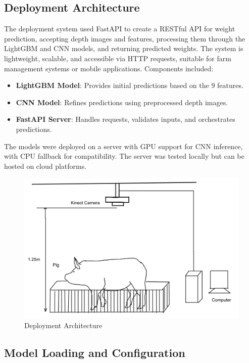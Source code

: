 {\subsection{Deployment Architecture}

The deployment system used FastAPI to create a RESTful API for weight prediction, accepting depth images and features, processing them through the LightGBM and CNN models, and returning predicted weights. The system is lightweight, scalable, and accessible via HTTP requests, suitable for farm management systems or mobile applications. Components included:

\begin{itemize}
	\item \textbf{LightGBM Model}: Provides initial predictions based on the 9 features.
	\item \textbf{CNN Model}: Refines predictions using preprocessed depth images.
	\item \textbf{FastAPI Server}: Handles requests, validates inputs, and orchestrates predictions.
\end{itemize}

The models were deployed on a server with GPU support for CNN inference, with CPU fallback for compatibility. The server was tested locally but can be hosted on cloud platforms.

\begin{figure}[h]
	\centering
	\includegraphics[height=0.4\textheight]{figures/Untitled-1wqw}
	\caption{Deployment Architecture}
	\label{fig:Deployment Architecture}
\end{figure}

\subsection{Model Loading and Configuration}

}
